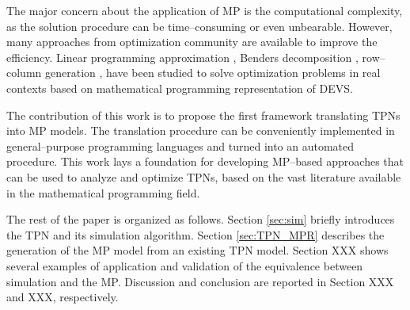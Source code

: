 \documentclass[suppldata]{interact}
\theoremstyle{plain}
\theoremstyle{definition}
\theoremstyle{remark}
\begin{document}
The major concern about the application of MP is the computational complexity, %
as the solution procedure can be time--consuming or even unbearable. However, many approaches from optimization community are available to improve the efficiency. Linear programming approximation \citep{alfieri2012mathematical}, Benders decomposition \citep{weiss2015buffer}, row--column generation \citep{alfieri2020time}, have been studied to solve optimization problems in %
real contexts based on mathematical programming representation of DEVS.


The contribution of this work is to propose the first framework translating TPNs into MP models. The translation procedure can be conveniently implemented in general--purpose programming languages and turned into an automated procedure. This work lays a foundation %
for developing MP--based approaches %
that can be used to analyze and optimize TPNs, based on the vast literature available in the mathematical programming field. 


The rest of the paper is organized as follows. Section \ref{sec:sim} briefly introduces the TPN and its simulation algorithm. Section \ref{sec:TPN_MPR} describes the generation of the MP model from an existing TPN model. Section XXX shows several examples of application and validation of the equivalence between simulation and the MP. Discussion and conclusion are reported in Section XXX and XXX, respectively.







\end{document}
